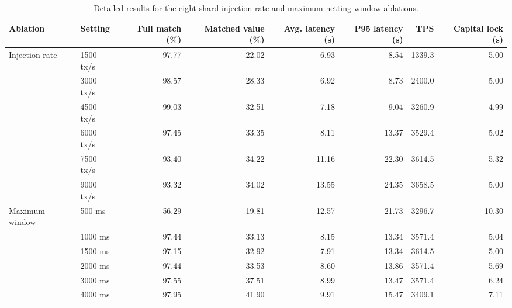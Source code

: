 \begin{table}[t]
\centering
\caption{Detailed results for the eight-shard injection-rate and maximum-netting-window ablations.}
\label{tab:shard8-ablation}
\small
\setlength{\tabcolsep}{3.5pt}
\begin{tabular}{llrrrrrr}
\toprule
Ablation & Setting & Full match (\%) & Matched value (\%) & Avg. latency (s) & P95 latency (s) & TPS & Capital lock (s) \\
\midrule
Injection rate & 1500 tx/s & 97.77 & 22.02 & 6.93 & 8.54 & 1339.3 & 5.00 \\
 & 3000 tx/s & 98.57 & 28.33 & 6.92 & 8.73 & 2400.0 & 5.00 \\
 & 4500 tx/s & 99.03 & 32.51 & 7.18 & 9.04 & 3260.9 & 4.99 \\
 & 6000 tx/s & 97.45 & 33.35 & 8.11 & 13.37 & 3529.4 & 5.02 \\
 & 7500 tx/s & 93.40 & 34.22 & 11.16 & 22.30 & 3614.5 & 5.32 \\
 & 9000 tx/s & 93.32 & 34.02 & 13.55 & 24.35 & 3658.5 & 5.00 \\
\midrule
Maximum window & 500 ms & 56.29 & 19.81 & 12.57 & 21.73 & 3296.7 & 10.30 \\
 & 1000 ms & 97.44 & 33.13 & 8.15 & 13.34 & 3571.4 & 5.04 \\
 & 1500 ms & 97.15 & 32.92 & 7.91 & 13.34 & 3614.5 & 5.00 \\
 & 2000 ms & 97.44 & 33.53 & 8.60 & 13.86 & 3571.4 & 5.69 \\
 & 3000 ms & 97.55 & 37.51 & 8.99 & 13.47 & 3571.4 & 6.24 \\
 & 4000 ms & 97.95 & 41.90 & 9.91 & 15.47 & 3409.1 & 7.11 \\
\bottomrule
\end{tabular}
\end{table}
